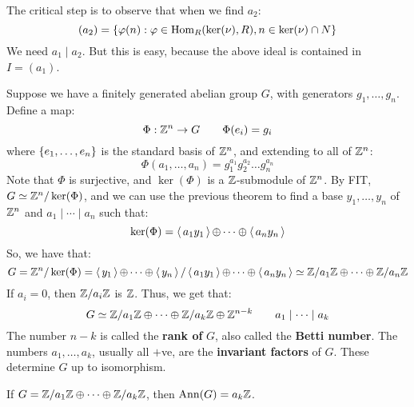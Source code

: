The critical step is to observe that when we find $ a_{2} $:
\begin{equation*}
    (a_{2}) = \left\{{\operatorname{\varphi}(n) : \operatorname{\varphi} \in \operatorname{Hom}_{R}(\ker(\nu), R),
    n \in \ker(\nu) \cap N}\right\}
\end{equation*}
We need $ a_{1} \mid a_{2} $.
But this is easy, because the above ideal is contained in $ I = (a_{1}) $.

Suppose we have a finitely generated abelian group $ G $, with generators
$ g_{1}, \dots, g_{n} $. Define a map:
\begin{equation*}
    \Phi: \mathbb{Z}^{n} \rightarrow G \qquad \Phi(e_{i}) = g_{i}
\end{equation*}
where $ \left\{{e_{1}, \dots, e_{n}}\right\} $ is the standard basis of $ \mathbb{Z}^{n} $,
and extending to all of $ \mathbb{Z}^{n} $:
\begin{equation*}
    \Phi(a_{1}, \dots, a_{n}) = g_{1}^{a_{1}}g_{2}^{a_{2}}\dots g_{n}^{a_{n}}
\end{equation*}
Note that $ \Phi $ is surjective, and $ \ker(\Phi) $ is a $ \mathbb{Z} $-submodule
of $ \mathbb{Z}^{n} $.
By FIT, $ G \simeq \mathbb{Z}^{n}/\ker(\Phi) $, and we can use the previous theorem
to find a base $ y_{1}, \dots, y_{n} $ of $ \mathbb{Z}^{n} $ and
$ a_{1} \mid \cdots \mid a_{n} $ such that:
\begin{equation*}
    \ker(\Phi) = \operatorname{\langle} a_{1}y_{1} \operatorname{\rangle} \oplus \cdots \oplus \operatorname{\langle} a_{n}y_{n} \operatorname{\rangle}
\end{equation*}
So, we have that:
\begin{equation*}
    G = \mathbb{Z}^{n}/\ker(\Phi) = \operatorname{\langle} y_{1} \operatorname{\rangle} \oplus \cdots \oplus \operatorname{\langle} y_{n} \operatorname{\rangle}
    / \operatorname{\langle} a_{1}y_{1} \operatorname{\rangle} \oplus \cdots \oplus \operatorname{\langle} a_{n}y_{n} \operatorname{\rangle}
    \simeq \mathbb{Z}/a_{1}\mathbb{Z} \oplus \cdots \oplus \mathbb{Z}/a_{n}\mathbb{Z}
\end{equation*}
If $ a_{i} = 0 $, then $ \mathbb{Z}/a_{i}\mathbb{Z} $ is $ \mathbb{Z} $.
Thus, we get that:
\begin{equation*}
    G \simeq \mathbb{Z}/a_{1}\mathbb{Z} \oplus \cdots \oplus \mathbb{Z}/a_{k}\mathbb{Z}
    \oplus \mathbb{Z}^{n-k} \qquad a_{1} \mid \cdots \mid a_{k}
\end{equation*}
The number $ n - k $ is called the \textbf{rank of} $ G $, also called the
\textbf{Betti number}. The numbers $ a_{1}, \dots, a_{k} $, usually all $ + $ve,
are the \textbf{invariant factors} of $ G $. These determine $ G $ up to
isomorphism.

If $ G = \mathbb{Z}/a_{1}\mathbb{Z} \oplus \cdots \oplus \mathbb{Z}/a_{k}\mathbb{Z} $, then
$ \operatorname{Ann}(G) = a_{k}\mathbb{Z} $.

